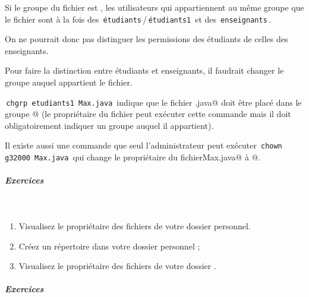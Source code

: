 \documentclass[11pt,a4paper]{article}
\begin{document}
          Si le groupe du fichier est \verb@users@, 
          les utilisateurs qui appartiennent au m\^eme groupe que le fichier sont \`a la fois
          des \,\verb|étudiants|\,/\,\verb|étudiants1|\, 
          et des \,\verb|enseignants|\,.
        
            \par
        
           On ne pourrait donc pas distinguer les permissions des \'etudiants de celles des enseignants.
				
            \par
        
				  Pour faire la distinction entre \'etudiants et enseignants, il faudrait changer le groupe auquel appartient le fichier.
				
            \par
        \,\verb|chgrp etudiants1 Max.java|\, indique que le fichier \verb@Max.java@ doit \^etre plac\'e dans le
				  groupe @ (le propri\'etaire du fichier peut ex\'ecuter cette commande mais il doit obligatoirement indiquer un groupe auquel il appartient).
				
            \par
        
				  Il existe aussi une commande que seul l'administrateur peut ex\'ecuter \,\verb|chown g32000 Max.java|\, 
				  qui change le propri\'etaire du fichier\verb@ Max.java@ \`a \verb@g32000@.
        
            \par
        
			
		\subparagraph{Exercices} 
		
					\textcolor{white}{.} \par
				
            \par
        
					\begin{enumerate}
				
			\item Visualisez le propri\'etaire des fichiers de votre dossier personnel.
			\item Cr\'eez un r\'epertoire \verb@tdLinux@ dans votre dossier personnel ;
			\item Visualisez le propri\'etaire des fichiers de votre dossier \verb@tdLinux@.
					
					\end{enumerate}
				
			
		\subparagraph{Exercices} 
		
\end{document}
